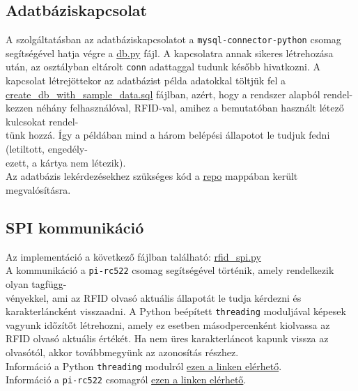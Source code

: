 \documentclass[11pt, a4paper]{article}
\begin{document}
		\subsection{Adatbáziskapcsolat}
			\begin{flushleft}
				\justifying
				A szolgáltatásban az adatbáziskapcsolatot a \texttt{mysql-connector-python} csomag segítségével hatja végre a
				\color{blue}
				\href{https://github.com/mark182182/GKLB_INTM020_mikroelektromechanikai_rendszerek/blob/main/db/db.py}{db.py}
				\color{black} fájl. A kapcsolatra annak sikeres létrehozása után, az osztályban eltárolt \texttt{conn} adattaggal tudunk később hivatkozni. A kapcsolat létrejöttekor az adatbázist példa adatokkal töltjük fel a \color{blue}
				\href{https://github.com/mark182182/GKLB_INTM020_mikroelektromechanikai_rendszerek/blob/main/db/create_db_with_sample_data.sql}{create\_db\_with\_sample\_data.sql}
				\color{black} fájlban, azért, hogy a rendszer alapból rendel-\\kezzen néhány felhasználóval, RFID-val, amihez a bemutatóban használt létező kulcsokat rendel-\\tünk hozzá. Így a példában mind a három belépési állapotot le tudjuk fedni (letiltott, engedély-\\ezett, a kártya nem létezik). \\
				Az adatbázis lekérdezésekhez szükséges kód a 
				\color{blue}
				\href{https://github.com/mark182182/GKLB_INTM020_mikroelektromechanikai_rendszerek/tree/main/repo}{repo}
				\color{black} mappában került megvalósításra.
			\end{flushleft}

		\subsection{SPI kommunikáció}
			\begin{flushleft}
				\justifying
				Az implementáció a következő fájlban található:
				\color{blue}
				\href{https://github.com/mark182182/GKLB_INTM020_mikroelektromechanikai_rendszerek/blob/main/raspi/rfid_spi.py}{rfid\_spi.py}
				\color{black} \\
				A kommunikáció a \texttt{pi-rc522} csomag segítségével történik, amely rendelkezik olyan tagfügg-\\vényekkel, ami az RFID olvasó aktuális állapotát le tudja kérdezni és karakterláncként visszaadni.
				A Python beépített \texttt{threading} moduljával képesek vagyunk időzítőt létrehozni, amely ez esetben másodpercenként kiolvassa az RFID olvasó aktuális értékét. Ha nem üres karakterláncot kapunk vissza az olvasótól, akkor továbbmegyünk az azonosítás részhez. \\
				Információ a Python \texttt{threading} modulról
				\color{blue}
				\href{https://docs.python.org/3/library/threading.html}{ezen a linken elérhető}\color{black}. \\
				Információ a \texttt{pi-rc522} csomagról
				\color{blue}
				\href{https://github.com/ondryaso/pi-rc522}{ezen a linken elérhető}\color{black}.
			\end{flushleft}
			
\end{document}
